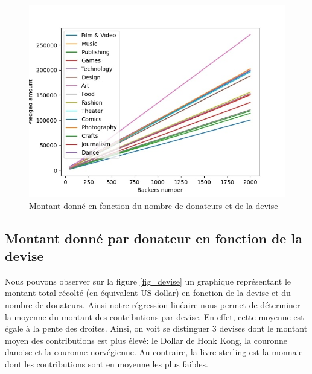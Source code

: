 \documentclass{article}
\begin{document}
\begin{figure}[htbp]
    \graphicspath{{graph/}} 
    \centerline{\includegraphics[scale=0.5]{main_category.jpg}}
    \caption{Montant donné en fonction du nombre de donateurs et de la devise}
    \label{fig_categorie}
\end{figure}    
\newpage 

\subsection{Montant donné par donateur en fonction de la devise}
\label{categorie}
\tabto{1cm} Nous pouvons observer sur la figure \ref{fig_devise} un graphique représentant le montant total récolté (en équivalent US dollar) en fonction de la devise et du nombre de donateurs. 
Ainsi notre régression linéaire nous permet de déterminer la moyenne du montant des contributions par devise. En effet, cette moyenne est égale à la pente des droites. Ainsi, on voit se distinguer 3 devises dont le montant moyen des contributions est plus élevé: 
le Dollar de Honk Kong, la couronne danoise et la couronne norvégienne. Au contraire, la livre sterling est la monnaie dont les contributions sont en moyenne les plus faibles.
\end{document}
